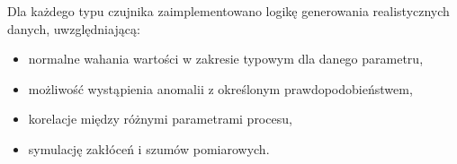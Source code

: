 \vspace{0.3em}

Dla każdego typu czujnika zaimplementowano logikę generowania realistycznych danych, uwzględniającą:
\begin{itemize}
    \item normalne wahania wartości w zakresie typowym dla danego parametru,
    \item możliwość wystąpienia anomalii z określonym prawdopodobieństwem,
    \item korelacje między różnymi parametrami procesu,
    \item symulację zakłóceń i szumów pomiarowych.
\end{itemize}
